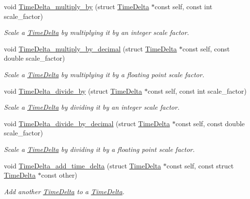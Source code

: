 \begin{DoxyCompactItemize}
void \hyperlink{time-delta_8h_a772db85da3c67f149da8877ac8d04fad}{\-Time\-Delta\-\_\-multiply\-\_\-by} (struct \hyperlink{structTimeDelta}{\-Time\-Delta} $\ast$const self, const int scale\-\_\-factor)
\begin{DoxyCompactList}\small\item\em \-Scale a \hyperlink{structTimeDelta}{\-Time\-Delta} by multiplying it by an integer scale factor. \end{DoxyCompactList}\item 
void \hyperlink{time-delta_8h_a561fba60f8ba4648928fec8e18069ebb}{\-Time\-Delta\-\_\-multiply\-\_\-by\-\_\-decimal} (struct \hyperlink{structTimeDelta}{\-Time\-Delta} $\ast$const self, const double scale\-\_\-factor)
\begin{DoxyCompactList}\small\item\em \-Scale a \hyperlink{structTimeDelta}{\-Time\-Delta} by multiplying it by a floating point scale factor. \end{DoxyCompactList}\item 
void \hyperlink{time-delta_8h_abab39f5630f78511f708765da0be8632}{\-Time\-Delta\-\_\-divide\-\_\-by} (struct \hyperlink{structTimeDelta}{\-Time\-Delta} $\ast$const self, const int scale\-\_\-factor)
\begin{DoxyCompactList}\small\item\em \-Scale a \hyperlink{structTimeDelta}{\-Time\-Delta} by dividing it by an integer scale factor. \end{DoxyCompactList}\item 
void \hyperlink{time-delta_8h_acca21ee20d4addbd3925461259f4f12a}{\-Time\-Delta\-\_\-divide\-\_\-by\-\_\-decimal} (struct \hyperlink{structTimeDelta}{\-Time\-Delta} $\ast$const self, const double scale\-\_\-factor)
\begin{DoxyCompactList}\small\item\em \-Scale a \hyperlink{structTimeDelta}{\-Time\-Delta} by dividing it by a floating point scale factor. \end{DoxyCompactList}\item 
void \hyperlink{time-delta_8h_a33057bdcfab84bd7d6b2e54f2e244bc4}{\-Time\-Delta\-\_\-add\-\_\-time\-\_\-delta} (struct \hyperlink{structTimeDelta}{\-Time\-Delta} $\ast$const self, const struct \hyperlink{structTimeDelta}{\-Time\-Delta} $\ast$const other)
\begin{DoxyCompactList}\small\item\em \-Add another \hyperlink{structTimeDelta}{\-Time\-Delta} to a \hyperlink{structTimeDelta}{\-Time\-Delta}. \end{DoxyCompactList}\item 

\end{DoxyCompactItemize}
